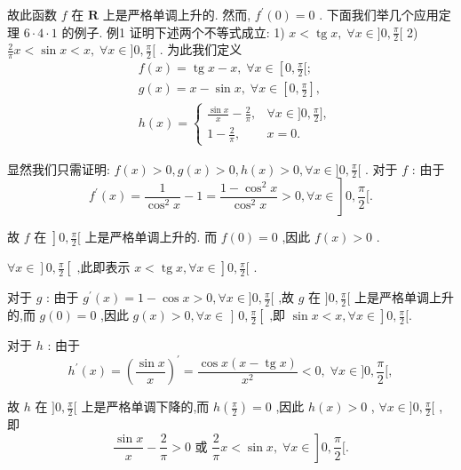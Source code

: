 故此函数 $f$ 在 $\mathbf{R}$ 上是严格单调上升的. 然而, ${f}^{\prime }\left( 0\right)  = 0$ . 下面我们举几个应用定理 $6 \cdot  4 \cdot  1$ 的例子. 例1 证明下述两个不等式成立: 1) $x < \operatorname{tg}x,\;\forall x \in  \rbrack 0,\frac{\pi }{2}\lbrack$ 2) $\frac{2}{\pi }x < \sin x < x,\;\forall x \in  \rbrack 0,\frac{\pi }{2}\lbrack$ . 为此我们定义
\begin{align*}
	&f\left( x\right)  = \operatorname{tg}x - x,\;\forall x \in  \left\lbrack  {0,\frac{\pi }{2}\lbrack ;}\right.\\
	&g\left( x\right)  = x - \sin x,\;\forall x \in  \left\lbrack  {0,\frac{\pi }{2}}\right\rbrack  ,\\
	&h\left( x\right)  = \left\{  \begin{array}{ll} \frac{\sin x}{x} - \frac{2}{\pi }, & \forall x \in  \rbrack 0,\frac{\pi }{2}\rbrack , \\  1 - \frac{2}{\pi }, & x = 0. \end{array}\right.
\end{align*}

显然我们只需证明: $f\left( x\right)  > 0,g\left( x\right)  > 0,h\left( x\right)  > 0,\forall x \in  \rbrack 0,\frac{\pi }{2}\lbrack$ . 对于 $f$ : 由于
$$\left. {{f}^{\prime }\left( x\right)  = \frac{1}{{\cos }^{2}x} - 1 = \frac{1 - {\cos }^{2}x}{{\cos }^{2}x} > 0,\forall x \in  }\right\rbrack  0,\frac{\pi }{2}\lbrack .$$

故 $\left. {f\text{ 在 }}\right\rbrack  0,\frac{\pi }{2}\lbrack$ 上是严格单调上升的. 而 $f\left( 0\right)  = 0$ ,因此 $f\left( x\right)  > 0$ .

$\left. {\forall x \in  }\right\rbrack  0,\frac{\pi }{2}\left\lbrack  {\text{ ,此即表示 }x < \operatorname{tg}x,\forall x \in  }\right\rbrack  0,\frac{\pi }{2}\lbrack$ .

对于 $g$ : 由于 ${g}^{\prime }\left( x\right)  = 1 - \cos x > 0,\forall x \in  \rbrack 0,\frac{\pi }{2}\lbrack$ ,故 $g$ 在 $\rbrack 0,\frac{\pi }{2}\lbrack$ 上是严格单调上升的,而 $g\left( 0\right)  = 0$ ,因此 $g\left( x\right)  > 0,\forall x \in$ ] $0,\frac{\pi }{2}\left\lbrack  {\text{ ,即 }\sin x < x,\forall x \in  }\right\rbrack  0,\frac{\pi }{2}\lbrack .$

对于 $h$ : 由于
$${h}^{\prime }\left( x\right)  = {\left( \frac{\sin x}{x}\right) }^{\prime } = \frac{\cos x\left( {x - \operatorname{tg}x}\right) }{{x}^{2}} < 0,\;\forall x \in  \rbrack 0,\frac{\pi }{2}\lbrack ,$$

故 $h$ 在 $\rbrack 0,\frac{\pi }{2}\lbrack$ 上是严格单调下降的,而 $h\left( \frac{\pi }{2}\right)  = 0$ ,因此 $h\left( x\right)  > 0$ , $\forall x \in  \rbrack 0,\frac{\pi }{2}\lbrack$ ,即
$$\left. {\frac{\sin x}{x} - \frac{2}{\pi } > 0\text{ 或 }\frac{2}{\pi }x < \sin x,\;\forall x \in  }\right\rbrack  0,\frac{\pi }{2}\lbrack .$$

